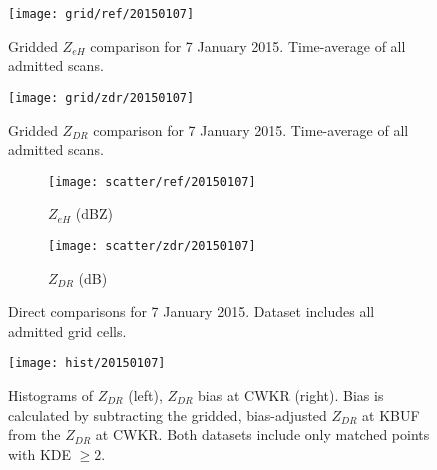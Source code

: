\begin{figure}[H]
\texttt{[image: grid/ref/20150107]}
\caption{Gridded $Z_{eH}$ comparison for 7 January 2015. Time-average of all admitted scans.} 
\label{fig:grid_ref_20150107}
\end{figure}

\begin{figure}[H]
\texttt{[image: grid/zdr/20150107]}
\caption{Gridded $Z_{DR}$ comparison for 7 January 2015. Time-average of all admitted scans.} 
\label{fig:grid_zdr_20150107}
\end{figure}
\begin{figure}[H]
\centering
   \begin{subfigure}{0.49\linewidth} \centering
     \texttt{[image: scatter/ref/20150107]}
     \caption{$Z_{eH}$ (dBZ)}\label{fig:scatter_ref_20150107}
   \end{subfigure}
   \begin{subfigure}{0.49\linewidth} \centering
     \texttt{[image: scatter/zdr/20150107]}
     \caption{$Z_{DR}$ (dB)}\label{fig:scatter_zdr_20150107}
   \end{subfigure}
\caption{Direct comparisons for 7 January 2015. Dataset includes all admitted grid cells.} \label{fig:scatter_20150107}
\end{figure}

\begin{figure}[H]
\texttt{[image: hist/20150107]}\centering
\caption{Histograms of $Z_{DR}$ (left), $Z_{DR}$ bias at CWKR (right). Bias is calculated by subtracting the gridded, bias-adjusted $Z_{DR}$ at KBUF from the
$Z_{DR}$ at CWKR. Both datasets include only matched points with KDE $\geq 2$.} 
\label{fig:hist_20150107}
\end{figure}

